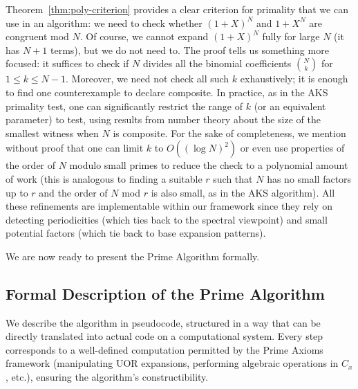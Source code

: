 \documentclass[11pt]{article}
\begin{document}
Theorem~\ref{thm:poly-criterion} provides a clear criterion for primality that we can use in an algorithm: we need to check whether $(1+X)^N$ and $1+X^N$ are congruent mod $N$. Of course, we cannot expand $(1+X)^N$ fully for large $N$ (it has $N+1$ terms), but we do not need to. The proof tells us something more focused: it suffices to check if $N$ divides all the binomial coefficients $\binom{N}{k}$ for $1 \le k \le N-1$. Moreover, we need not check all such $k$ exhaustively; it is enough to find one counterexample to declare composite. In practice, as in the AKS primality test, one can significantly restrict the range of $k$ (or an equivalent parameter) to test, using results from number theory about the size of the smallest witness when $N$ is composite. For the sake of completeness, we mention without proof that one can limit $k$ to $O((\log N)^2)$ or even use properties of the order of $N$ modulo small primes to reduce the check to a polynomial amount of work (this is analogous to finding a suitable $r$ such that $N$ has no small factors up to $r$ and the order of $N$ mod $r$ is also small, as in the AKS algorithm). All these refinements are implementable within our framework since they rely on detecting periodicities (which ties back to the spectral viewpoint) and small potential factors (which tie back to base expansion patterns).

We are now ready to present the Prime Algorithm formally.

\subsection{Formal Description of the Prime Algorithm}
We describe the algorithm in pseudocode, structured in a way that can be directly translated into actual code on a computational system. Every step corresponds to a well-defined computation permitted by the Prime Axioms framework (manipulating UOR expansions, performing algebraic operations in $C_x$, etc.), ensuring the algorithm’s constructibility.
\end{document}
